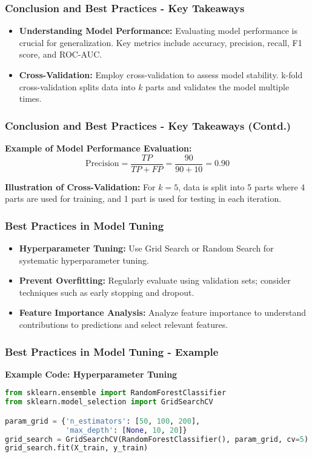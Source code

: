 \documentclass[aspectratio=169]{beamer}
\begin{document}
\begin{frame}[fragile]
    \frametitle{Conclusion and Best Practices - Key Takeaways}
    \begin{itemize}
        \item \textbf{Understanding Model Performance:} 
        Evaluating model performance is crucial for generalization. Key metrics include accuracy, precision, recall, F1 score, and ROC-AUC.
        
        \item \textbf{Cross-Validation:} 
        Employ cross-validation to assess model stability. k-fold cross-validation splits data into \( k \) parts and validates the model multiple times.
    \end{itemize}
\end{frame}

\begin{frame}[fragile]
    \frametitle{Conclusion and Best Practices - Key Takeaways (Contd.)}
    \textbf{Example of Model Performance Evaluation:}
    \begin{equation}
        \text{Precision} = \frac{TP}{TP + FP} = \frac{90}{90 + 10} = 0.90
    \end{equation}

    \textbf{Illustration of Cross-Validation:}
    For \( k=5 \), data is split into 5 parts where 4 parts are used for training, and 1 part is used for testing in each iteration.
\end{frame}

\begin{frame}[fragile]
    \frametitle{Best Practices in Model Tuning}
    \begin{itemize}
        \item \textbf{Hyperparameter Tuning:} 
        Use Grid Search or Random Search for systematic hyperparameter tuning. 

        \item \textbf{Prevent Overfitting:} 
        Regularly evaluate using validation sets; consider techniques such as early stopping and dropout.

        \item \textbf{Feature Importance Analysis:} 
        Analyze feature importance to understand contributions to predictions and select relevant features.        
    \end{itemize}
\end{frame}

\begin{frame}[fragile]
    \frametitle{Best Practices in Model Tuning - Example}
    \textbf{Example Code: Hyperparameter Tuning}
    \begin{lstlisting}[language=Python]
from sklearn.ensemble import RandomForestClassifier
from sklearn.model_selection import GridSearchCV

param_grid = {'n_estimators': [50, 100, 200], 
              'max_depth': [None, 10, 20]}
grid_search = GridSearchCV(RandomForestClassifier(), param_grid, cv=5)
grid_search.fit(X_train, y_train)
    \end{lstlisting}
\end{frame}
\end{document}
